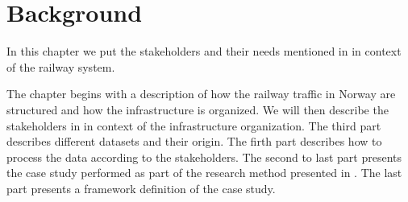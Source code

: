 
\chapter{Background}
\label{chapter:background}
In this chapter we put the stakeholders and their needs mentioned in 
 in context of the railway system. 

The chapter begins with a description of how the railway traffic in Norway
are structured and how the infrastructure is organized. We will then describe
the stakeholders in in context of the infrastructure organization. The third
part describes different datasets and their origin. The firth part describes
how to process the data according to the stakeholders. The second to last part
presents the case study performed as part of the research method presented in
. The last part presents a framework definition of
the case study.






 

